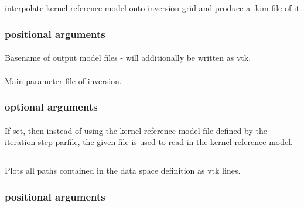 \subsection{} \label{programs_scripts,sec:bin_prog,sec:krm_kim}
interpolate kernel reference model onto inversion grid and produce a .kim file of it

\subsubsection{positional arguments}
\paragraph{}
Basename of output model files - will additionally be written as vtk.
\paragraph{}
Main parameter file of inversion.
\subsubsection{optional arguments}
\paragraph{}
If set, then instead of using the kernel reference model file defined by the iteration step parfile, the given file  is used to read in the kernel reference model.
%
%
\subsection{} \label{programs_scripts,sec:bin_prog,sec:path_to_vtk}  
Plots all paths contained in the data space definition as vtk lines. 
\subsubsection{positional arguments}
